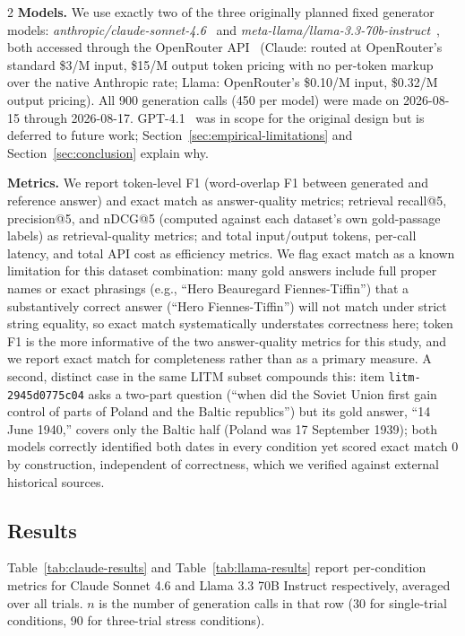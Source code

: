 \documentclass[11pt,a4paper]{article}
\begin{document}
\begin{multicols}{2}
\textbf{Models.} We use exactly two of the three originally planned fixed generator models: \textit{anthropic/claude-sonnet-4.6}~\cite{anthropic2026sonnet46} and \textit{meta-llama/llama-3.3-70b-instruct}~\cite{meta2024llama33}, both accessed through the OpenRouter API~\cite{openrouter2026} (Claude: routed at OpenRouter's standard \$3/M input, \$15/M output token pricing with no per-token markup over the native Anthropic rate; Llama: OpenRouter's \$0.10/M input, \$0.32/M output pricing). All 900 generation calls (450 per model) were made on 2026-08-15 through 2026-08-17. GPT-4.1~\cite{openai2025gpt41} was in scope for the original design but is deferred to future work; Section~\ref{sec:empirical-limitations} and Section~\ref{sec:conclusion} explain why.

\textbf{Metrics.} We report token-level F1 (word-overlap F1 between generated and reference answer) and exact match as answer-quality metrics; retrieval recall@5, precision@5, and nDCG@5 (computed against each dataset's own gold-passage labels) as retrieval-quality metrics; and total input/output tokens, per-call latency, and total API cost as efficiency metrics. We flag exact match as a known limitation for this dataset combination: many gold answers include full proper names or exact phrasings (e.g., ``Hero Beauregard Fiennes-Tiffin'') that a substantively correct answer (``Hero Fiennes-Tiffin'') will not match under strict string equality, so exact match systematically understates correctness here; token F1 is the more informative of the two answer-quality metrics for this study, and we report exact match for completeness rather than as a primary measure. A second, distinct case in the same LITM subset compounds this: item \texttt{litm-2945d0775c04} asks a two-part question (``when did the Soviet Union first gain control of parts of Poland and the Baltic republics'') but its gold answer, ``14 June 1940,'' covers only the Baltic half (Poland was 17 September 1939); both models correctly identified both dates in every condition yet scored exact match 0 by construction, independent of correctness, which we verified against external historical sources.

\subsection{Results}
\label{sec:empirical-results}

Table~\ref{tab:claude-results} and Table~\ref{tab:llama-results} report per-condition metrics for Claude Sonnet 4.6 and Llama 3.3 70B Instruct respectively, averaged over all trials. $n$ is the number of generation calls in that row (30 for single-trial conditions, 90 for three-trial stress conditions).


\end{multicols}
\end{document}
